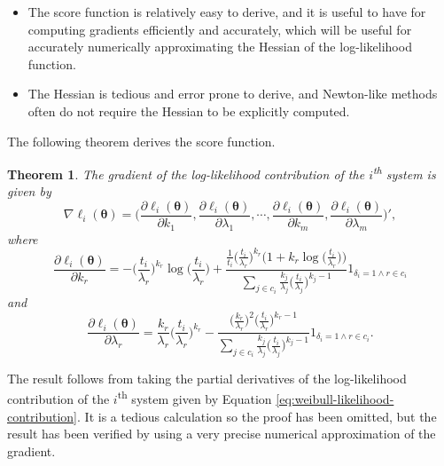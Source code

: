 \documentclass[
]{article}
\theoremstyle{definition}
\theoremstyle{plain}
\newtheorem{theorem}{Theorem}[section]
\theoremstyle{definition}
\theoremstyle{definition}
\theoremstyle{definition}
\theoremstyle{definition}
\theoremstyle{remark}
\begin{document}
\begin{itemize}
\item
  The score function is relatively easy to derive, and it is useful to have for
  computing gradients efficiently and accurately, which will be useful for
  accurately numerically approximating the Hessian of the log-likelihood function.
\item
  The Hessian is tedious and error prone to derive, and Newton-like methods
  often do not require the Hessian to be explicitly computed.
\end{itemize}

The following theorem derives the score function.

\begin{theorem}
\protect\hypertarget{thm:weibull-score}{}\label{thm:weibull-score}The gradient of the log-likelihood contribution of the \(i\)\textsuperscript{th} system is given by
\begin{equation}
\label{eq:weibull-score}
\nabla \ell_i(\boldsymbol{\theta}) = \biggl(
    \frac{\partial \ell_i(\boldsymbol{\theta})}{\partial k_1},
    \frac{\partial \ell_i(\boldsymbol{\theta})}{\partial \lambda_1},
    \cdots, 
    \frac{\partial \ell_i(\boldsymbol{\theta})}{\partial k_m},
    \frac{\partial \ell_i(\boldsymbol{\theta})}{\partial \lambda_m} \biggr)',
\end{equation}
where
\begin{equation}
\frac{\partial \ell_i(\boldsymbol{\theta})}{\partial k_r} = 
    -\biggl(\frac{t_i}{\lambda_r}\biggr)^{k_r}    
        \!\!\log\biggl(\frac{t_i}{\lambda_r}\biggr) +
        \frac{\frac{1}{t_i} \bigl(\frac{t_i}{\lambda_r}\bigr)^{k_r}
            \bigl(1+ k_r \log\bigl(\frac{t_i}{\lambda_r}\bigr)\bigr)}
            {\sum_{j \in c_i} \frac{k_j}{\lambda_j}\bigl(\frac{t_i}{\lambda_j}\bigr)^{k_j-1}}
        1_{\delta_i = 1 \land r \in c_i}
\end{equation}
and
\begin{equation}
\frac{\partial \ell_i(\boldsymbol{\theta})}{\partial \lambda_r} = 
    \frac{k_r}{\lambda_r} \biggl(\frac{t_i}{\lambda_r}\biggr)^{k_r} -
    \frac{
        \bigl(\frac{k_r}{\lambda_r}\bigr)^2 \bigl(\frac{t_i}{\lambda_r}\bigr)^{k_r - 1}
    }
    {
        \sum_{j \in c_i} \frac{k_j}{\lambda_j}\bigl(\frac{t_i}{\lambda_j}\bigr)^{k_j-1}
    }
    1_{\delta_i = 1 \land r \in c_i}.
\end{equation}
\end{theorem}

The result follows from taking the partial derivatives of the log-likelihood
contribution of the \(i\)\textsuperscript{th} system given by Equation
\eqref{eq:weibull-likelihood-contribution}. It is a tedious calculation so the
proof has been omitted, but the result has been verified by using a very precise
numerical approximation of the gradient.
\end{document}
